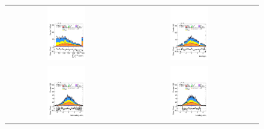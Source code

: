 \begin{figure}[htbp]
\begin{tabular}{@{}c c c@{}}
      \includegraphics[width=0.33\textwidth]{images/modelling_tmva_vars/plot_SumPtBjet_hh_tth.pdf} &
      \includegraphics[width=0.33\textwidth]{images/modelling_tmva_vars/plot_tau_0_eta_hh_tth.pdf} \\[4pt]
      \includegraphics[width=0.33\textwidth]{images/modelling_tmva_vars/plot_jet_1_eta_hh_tth.pdf} &
      \includegraphics[width=0.33\textwidth]{images/modelling_tmva_vars/plot_jet_0_eta_hh_tth.pdf} &

\end{tabular}
\end{figure}
